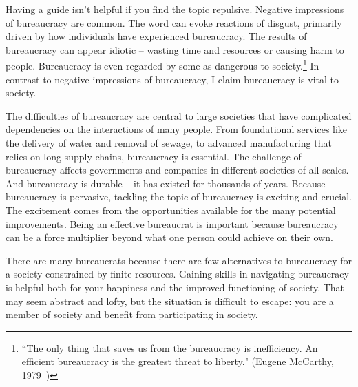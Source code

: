 Having a guide isn't helpful if you find the topic repulsive.
Negative impressions of bureaucracy are common. The word
can evoke reactions of disgust, primarily driven by how individuals have experienced bureaucracy.
The results of bureaucracy can appear idiotic -- 
wasting time and resources or causing harm to people.
Bureaucracy is even regarded by some as dangerous to society.\footnote{``The only thing that saves us from the bureaucracy is inefficiency. An efficient bureaucracy is the greatest threat to liberty." (Eugene McCarthy, 1979~\cite{1979_McCarthy})}
In contrast to negative impressions of bureaucracy, I claim bureaucracy is vital to society. 



The difficulties of bureaucracy are central to large societies that have complicated dependencies on the interactions of many people. From foundational services like the delivery of water and removal of sewage, to advanced manufacturing that relies on long supply chains, bureaucracy is essential.  The challenge of bureaucracy affects governments and companies in different societies of all scales. And bureaucracy is durable -- it has existed for thousands of years. Because bureaucracy is pervasive, tackling the topic of bureaucracy is exciting and crucial. The excitement comes from the opportunities available for the many potential improvements.
Being an effective bureaucrat is important because bureaucracy can be a \href{https://en.wikipedia.org/wiki/Force_multiplication}{force multiplier}\iftoggle{WPinmargin}{\marginpar{$>$Wikipedia: Force multiplication}}{}
beyond what one person could achieve on their own.

There are many bureaucrats because there are few alternatives to bureaucracy for a society constrained by finite resources. Gaining skills in navigating bureaucracy is helpful both for your happiness and the improved functioning of society. That may seem abstract and lofty, but the situation is difficult to escape: you are a member of society and benefit from participating in society. 


